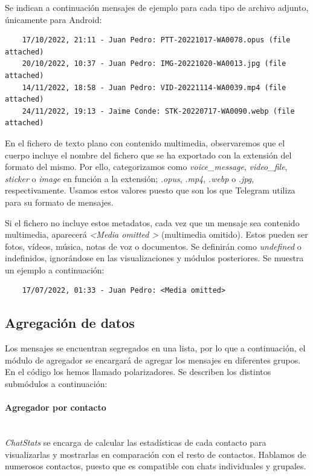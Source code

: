 Se indican a continuación mensajes de ejemplo para cada tipo de archivo adjunto, únicamente para Android:

\begin{lstlisting}
	17/10/2022, 21:11 - Juan Pedro: PTT-20221017-WA0078.opus (file attached)
	20/10/2022, 10:37 - Juan Pedro: IMG-20221020-WA0013.jpg (file attached)
	14/11/2022, 18:58 - Juan Pedro: VID-20221114-WA0039.mp4 (file attached)
	24/11/2022, 19:13 - Jaime Conde: STK-20220717-WA0090.webp (file attached)
\end{lstlisting}

En el fichero de texto plano con contenido multimedia, observaremos que el cuerpo incluye el nombre del fichero que se ha exportado con la extensión del formato del mismo. Por ello, categorizamos como \textit{voice\_message}, \textit{video\_file}, \textit{sticker} o \textit{image} en función a la extensión; \textit{.opus}, \textit{.mp4}, \textit{.webp} o \textit{.jpg}, respectivamente. Usamos estos valores puesto que son los que Telegram utiliza para su formato de mensajes.

Si el fichero no incluye estos metadatos, cada vez que un mensaje sea contenido multimedia, aparecerá \textit{\textless Media omitted \textgreater} (multimedia omitido). Estos pueden ser fotos, vídeos, música, notas de voz o documentos. Se definirán como \textit{undefined} o indefinidos, ignorándose en las visualizaciones y módulos posteriores. Se muestra un ejemplo a continuación:

\begin{lstlisting}
	17/07/2022, 01:33 - Juan Pedro: <Media omitted>
\end{lstlisting}

\subsection{Agregación de datos}

Los mensajes se encuentran segregados en una lista, por lo que a continuación, el módulo de agregador se encargará de agregar los mensajes en diferentes grupos. En el código los hemos llamado polarizadores. Se describen los distintos submódulos a continuación:

\paragraph{Agregador por contacto}\mbox{}\\

\textit{ChatStats} se encarga de calcular las estadísticas de cada contacto para visualizarlas y mostrarlas en comparación con el resto de contactos. Hablamos de numerosos contactos, puesto que es compatible con chats individuales y grupales.

